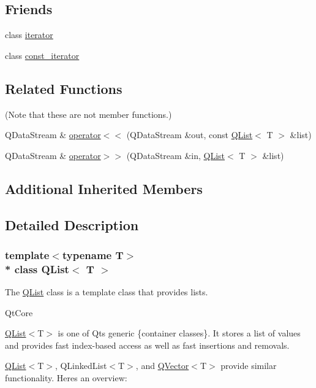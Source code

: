 \subsection*{Friends}
\begin{DoxyCompactItemize}
\item 
class \hyperlink{class_q_list_a67171474c4da6cc8efe0c7fafefd2b2d}{iterator}
\item 
class \hyperlink{class_q_list_ac220ce1c155db1ac44146c12d178056f}{const\+\_\+iterator}
\end{DoxyCompactItemize}
\subsection*{Related Functions}
(Note that these are not member functions.) \begin{DoxyCompactItemize}
\item 
Q\+Data\+Stream \& \hyperlink{class_q_list_ac29861f3dbb1fff94b022d274713e3b8}{operator$<$$<$} (Q\+Data\+Stream \&out, const \hyperlink{class_q_list}{Q\+List}$<$ T $>$ \&list)
\item 
Q\+Data\+Stream \& \hyperlink{class_q_list_ab4ba1c178d4cab8a72ef68798eaefabc}{operator$>$$>$} (Q\+Data\+Stream \&in, \hyperlink{class_q_list}{Q\+List}$<$ T $>$ \&list)
\end{DoxyCompactItemize}
\subsection*{Additional Inherited Members}


\subsection{Detailed Description}
\subsubsection*{template$<$typename T$>$\\*
class Q\+List$<$ T $>$}

The \hyperlink{class_q_list}{Q\+List} class is a template class that provides lists. 

Qt\+Core

\hyperlink{class_q_list}{Q\+List}$<$T$>$ is one of Qt\textquotesingle{}s generic \{container classes\}. It stores a list of values and provides fast index-\/based access as well as fast insertions and removals.

\hyperlink{class_q_list}{Q\+List}$<$T$>$, Q\+Linked\+List$<$T$>$, and \hyperlink{class_q_vector}{Q\+Vector}$<$T$>$ provide similar functionality. Here\textquotesingle{}s an overview\+:

